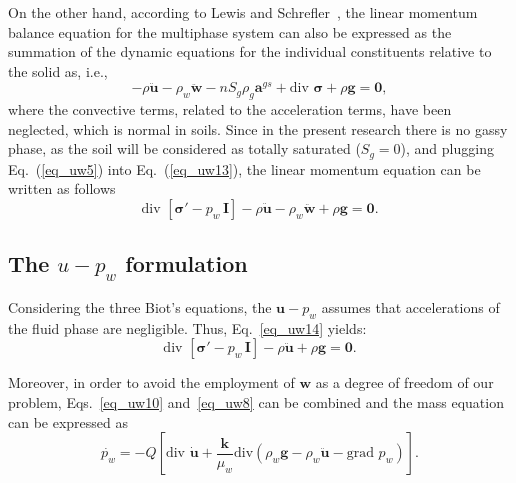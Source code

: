 \documentclass[twocolumn]{svjour3}          %
\begin{document}
On the other hand, according to Lewis and Schrefler~\cite{LewisSchrefler98},   the linear momentum balance equation for the multiphase system  can also be expressed as the summation of the dynamic equations for the individual constituents relative to the solid as, i.e.,
\begin{equation}\label{eq_uw13}
-\rho\ddot{\boldsymbol{u}} - \rho_w\ddot{\boldsymbol{w}}-nS_g\rho_g\boldsymbol{a}^{gs}+ \mbox{div } \boldsymbol{\sigma}+\rho\boldsymbol{g}=\boldsymbol{0},
\end{equation}
where the convective terms, related to the acceleration terms, have been neglected, which is normal in soils. Since in the present research there is no gassy phase, as the soil will be considered as totally saturated ($S_g=0$), and plugging Eq.~(\ref{eq_uw5}) into Eq.~(\ref{eq_uw13}), the linear momentum equation can be written as follows
\begin{equation}\label{eq_uw14}
\mbox{div }\left[ \boldsymbol{ \sigma'} - p_{w} \, \textbf{I} \right]-\rho\boldsymbol{\ddot{u}}-\rho_w\boldsymbol{\ddot{w}}+\rho\boldsymbol{g}=\boldsymbol{0}.
\end{equation}
\subsection{The $u-p_w$ formulation}
\label{subsec:23}
Considering the three Biot's equations, the $\boldsymbol{u}-p_w$ assumes that accelerations of the fluid phase are negligible. Thus, Eq.~\eqref{eq_uw14} yields:
\begin{equation}\label{eq_uw15}
\mbox{div }\left[ \boldsymbol{ \sigma'} - p_{w} \, \textbf{I} \right]-\rho\boldsymbol{\ddot{u}}+\rho\boldsymbol{g}=\boldsymbol{0}.
\end{equation}

Moreover, in order to avoid the employment of $\boldsymbol{w}$ as a degree of freedom of our problem, Eqs.~\eqref{eq_uw10} and~\eqref{eq_uw8} can be combined and the mass equation can be expressed as
\begin{equation}\label{eq_uw11}
\dot{p_w} = -Q\left [ \mbox{div } \dot{\boldsymbol{u}} + \frac{\boldsymbol{k}}{\mu_w} \mbox{div}\left(   \rho_w \boldsymbol{g} - \rho_w \ddot{\boldsymbol{u}} - \mbox{grad }p_w\right)\right ].
\end{equation}
\end{document}
